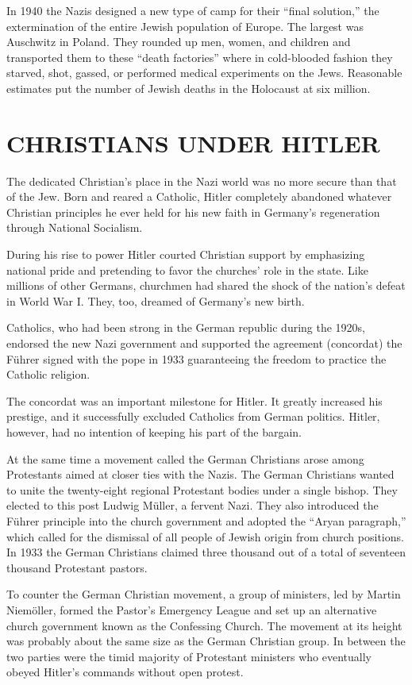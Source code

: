 In 1940 the Nazis designed a new type of camp for their “final solution,” the extermination of the
entire Jewish population of Europe. The largest was Auschwitz in Poland. They rounded up men, women,
and children and transported them to these “death factories” where in cold-blooded fashion they
starved, shot, gassed, or performed medical experiments on the Jews. Reasonable estimates put the
number of Jewish deaths in the Holocaust at six million.

\section{CHRISTIANS UNDER HITLER}

The dedicated Christian’s place in the Nazi world was no more secure than that of the Jew. Born and
reared a Catholic, Hitler completely abandoned whatever Christian principles he ever held for his
new faith in Germany’s regeneration through National Socialism.

During his rise to power Hitler courted Christian support by emphasizing national pride and
pretending to favor the churches’ role in the state. Like millions of other Germans, churchmen had
shared the shock of the nation’s defeat in World War I. They, too, dreamed of Germany’s new birth.

Catholics, who had been strong in the German republic during the 1920s, endorsed the new Nazi
government and supported the agreement (concordat) the Führer signed with the pope in 1933
guaranteeing the freedom to practice the Catholic religion.

The concordat was an important milestone for Hitler. It greatly increased his prestige, and it
successfully excluded Catholics from German politics. Hitler, however, had no intention of keeping
his part of the bargain.

At the same time a movement called the German Christians arose among Protestants aimed at closer
ties with the Nazis. The German Christians wanted to unite the twenty-eight regional Protestant
bodies under a single bishop. They elected to this post Ludwig Müller, a fervent Nazi. They also
introduced the Führer principle into the church government and adopted the “Aryan paragraph,” which
called for the dismissal of all people of Jewish origin from church positions. In 1933 the German
Christians claimed three thousand out of a total of seventeen thousand Protestant pastors.

To counter the German Christian movement, a group of ministers, led by Martin Niemöller, formed the
Pastor’s Emergency League and set up an alternative church government known as the Confessing
Church. The movement at its height was probably about the same size as the German Christian group.
In between the two parties were the timid majority of Protestant ministers who eventually obeyed
Hitler’s commands without open protest.

